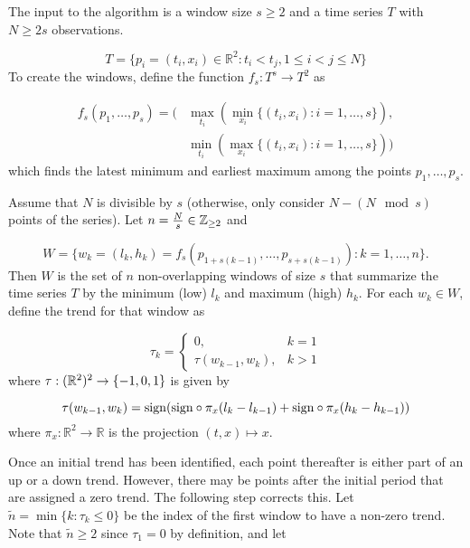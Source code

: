 \documentclass[../trend-calculus.tex]{subfiles}
\begin{document}
  The input to the algorithm is a window size $s \ge 2$ and a time series $T$ with $N \ge 2s$ observations.

  \begin{equation*}
    T = \{ p_i = (t_i, x_i) \in \mathbb{R}^2 : t_i < t_j, 1 \le i < j \le N \}
  \end{equation*}
  To create the windows, define the function $f_s : T^s \to T^2$ as

  \begin{align*}
    f_s(p_1, \dots, p_s) = ( & \max_{t_i} (\min_{x_i} \{ (t_i, x_i) : i = 1,\dots,s \}), \\
    & \min_{t_i} (\max_{x_i} \{ (t_i, x_i) : i = 1,\dots,s \}) )
  \end{align*}
  which finds the latest minimum and earliest maximum among the points $p_1,\dots,p_s$. 

  Assume that $N$ is divisible by $s$ 
  (otherwise, only consider $N - (N \mod s)$ points of the series).
  Let $n = \frac{N}{s} \in \mathbb{Z}_{\ge 2}$ and 

  \begin{equation*}
    W = \{ w_k = (l_k, h_k) = f_s(p_{1+s(k-1)},\dots,p_{s+s(k-1)}) : k = 1,\dots,n\}. 
  \end{equation*}
  Then $W$ is the set of $n$ non-overlapping windows of size $s$ that summarize the time series $T$ by 
  the minimum (low) $l_k$ and maximum (high) $h_k$.
  For each $w_k \in W$, define the trend for that window as 

  \begin{equation*}
    \tau_k = \begin{cases}
      0, & k = 1 \\
      \tau(w_{k-1}, w_k), & k > 1
    \end{cases}
  \end{equation*}
  where $\tau : (\mathbb{R}^2)^2 \to \{-1,0,1\}$ is given by

  \begin{equation*}
    \tau(w_{k-1}, w_k) = {\mathop{\rm sign}}({\mathop{\rm sign}} \circ \pi_x(l_k - l_{k-1}) + {\mathop{\rm sign}} \circ \pi_x(h_k - h_{k-1}))
  \end{equation*}
  where $\pi_x : \mathbb{R}^2 \to \mathbb{R}$ is the projection $(t,x) \mapsto x$.

  Once an initial trend has been identified, 
  each point thereafter is either part of an up or a down trend.
  However, there may be points after the initial period that are assigned a zero trend.
  The following step corrects this.
  Let $\tilde n = \min \{ k : \tau_k \le 0 \}$ be the index of the first window to have a non-zero trend.
  Note that $\tilde n \ge 2$ since $\tau_1 = 0$ by definition, and let
\end{document}
